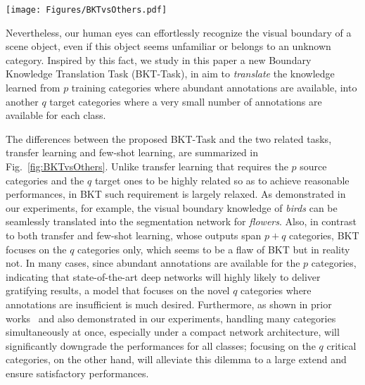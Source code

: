 \documentclass[letterpaper]{article} %
\newcommand{\xwc}[1]{\textcolor{red}{\bf [Comments: #1] }}
\begin{document}
\begin{figure*}[!t]
\centering
\texttt{[image: Figures/BKTvsOthers.pdf]}
\caption{
Comparing the proposed BKT with transfer learning and few-shot learning. Specifically, BKT \emph{translates} the knowledge learned from $p$ training categories into another $q$ ones, where the $p$ and $q$ categories are disjoint. Unlike transfer learning and few-shot learning based tasks where the trained models eventually tackle $p+q$ categories, {BKT  concentrates on the $q$ testing categories only.}
}
\vspace{-0.5em}
\label{fig:BKTvsOthers}
\end{figure*}

Nevertheless, our human eyes can effortlessly recognize the visual boundary of a scene object, even if this object seems unfamiliar or belongs to an unknown category.
Inspired by this fact, we study in this paper
a new Boundary Knowledge Translation Task (BKT-Task),
in aim to \emph{translate} the knowledge learned from
$p$ training categories where abundant annotations are available, into {another $q$ target categories} where a very small number of annotations are available for each class.

The differences between the proposed
BKT-Task and the two related tasks,
transfer learning and few-shot learning,
are summarized in Fig.~\ref{fig:BKTvsOthers}.
Unlike transfer learning that requires the $p$ source categories
and the $q$ target ones to be highly related so as to achieve reasonable performances,
in BKT such requirement is largely relaxed.
As demonstrated in our experiments, for example,
{the visual boundary knowledge of \emph{birds} can be
seamlessly translated into the segmentation network for \emph{flowers}.}
Also, in contrast to both transfer and few-shot learning,
whose outputs span $p+q$ categories,
BKT focuses on the $q$ categories only,
which seems to be a flaw of BKT but in reality not.
In many cases, since abundant annotations are available
for the $p$ categories, indicating that
state-of-the-art deep networks will highly likely to deliver
gratifying results,
a model that focuses on the novel $q$ categories
where annotations are insufficient is much desired.
Furthermore, as shown in prior works~\citep{chen2019unsupervised,minaee2020image,vinyals2016matching}
and also demonstrated in our experiments,
handling many categories simultaneously at once, especially
under a compact network architecture, will significantly
downgrade the performances for all classes;
focusing on the $q$ critical categories, on the other hand,
will alleviate this dilemma to a large extend
and ensure satisfactory performances.
\end{document}
